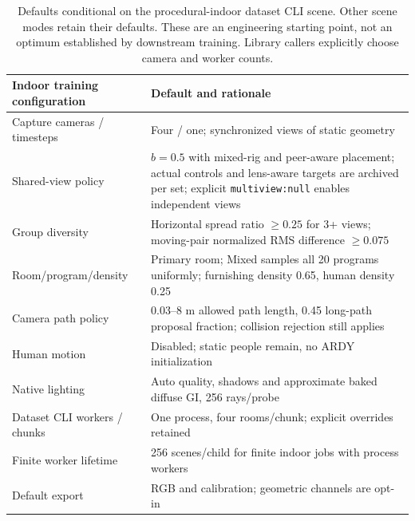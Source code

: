 \documentclass{article}
\begin{document}
\begin{table}[ht]
\centering\small
\begin{tabular}{p{.35\linewidth}p{.54\linewidth}}
\toprule
Indoor training configuration & Default and rationale\\\midrule
Capture cameras / timesteps & Four / one; synchronized views of static geometry\\
Shared-view policy & $b=0.5$ with mixed-rig and peer-aware placement; actual controls and lens-aware targets are archived per set; explicit \texttt{multiview:null} enables independent views\\
Group diversity & Horizontal spread ratio $\geq0.25$ for 3+ views; moving-pair normalized RMS difference $\geq0.075$\\
Room/program/density & Primary room; Mixed samples all 20 programs uniformly; furnishing density 0.65, human density 0.25\\
Camera path policy & 0.03--8 m allowed path length, 0.45 long-path proposal fraction; collision rejection still applies\\
Human motion & Disabled; static people remain, no ARDY initialization\\
Native lighting & Auto quality, shadows and approximate baked diffuse GI, 256 rays/probe\\
Dataset CLI workers / chunks & One process, four rooms/chunk; explicit overrides retained\\
Finite worker lifetime & 256 scenes/child for finite indoor jobs with process workers\\
Default export & RGB and calibration; geometric channels are opt-in\\\bottomrule
\end{tabular}
\caption{Defaults conditional on the procedural-indoor dataset CLI scene. Other scene modes retain their defaults. These are an engineering starting point, not an optimum established by downstream training. Library callers explicitly choose camera and worker counts.}
\end{table}
\end{document}
